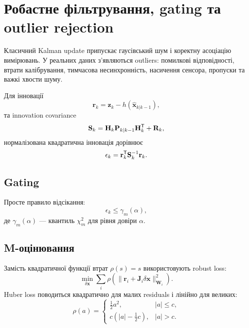 \chapter{Робастне фільтрування, gating та outlier rejection}
\label{chap:robust-filtering}


Класичний Kalman update припускає гаусівський шум і коректну асоціацію вимірювань. У реальних даних з'являються outliers: помилкові відповідності, втрати калібрування, тимчасова несинхронність, насичення сенсора, пропуски та важкі хвости шуму.

Для інновації
\begin{equation}
 \mathbf{r}_k=\mathbf{z}_k-h(\hat{\mathbf{x}}_{k|k-1}),
\end{equation}
та innovation covariance
\begin{equation}
 \mathbf{S}_k=\mathbf{H}_k\mathbf{P}_{k|k-1}\mathbf{H}_k^{\mathsf{T}}+\mathbf{R}_k,
\end{equation}
нормалізована квадратична інновація дорівнює
\begin{equation}
 \epsilon_k=\mathbf{r}_k^{\mathsf{T}}\mathbf{S}_k^{-1}\mathbf{r}_k.
\end{equation}

\section{Gating}

Просте правило відсікання:
\begin{equation}
 \epsilon_k \le \gamma_m(\alpha),
\end{equation}
де $\gamma_m(\alpha)$ --- квантиль $\chi^2_m$ для рівня довіри $\alpha$.

\section{M-оцінювання}

Замість квадратичної функції втрат $\rho(s)=s$ використовують robust loss:
\begin{equation}
 \min_{\delta\mathbf{x}} \sum_i \rho\left(\|\mathbf{r}_i+\mathbf{J}_i\delta\mathbf{x}\|^2_{\mathbf{W}_i}\right).
\end{equation}
Huber loss поводиться квадратично для малих residuals і лінійно для великих:
\begin{equation}
 \rho(a)=\begin{cases}
 \frac12 a^2, & |a|\le c,\\
 c(|a|-\frac12 c), & |a|>c.
 \end{cases}
\end{equation}

